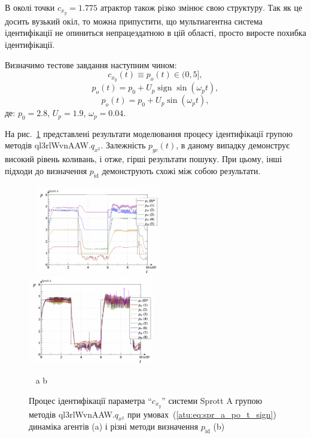 \documentclass[a4paper,13pt]{atuaref}
\DeclareMathOperator*{\sign}{sign}
\begin{document}
В околі точки $c_{x_y} = 1.775$ атрактор також різко змінює свою
структуру. Так як це досить вузький окіл, то можна припустити, що
мультиагентна система ідентифікації не опиниться непрацездатною в цій області,
просто виросте похибка ідентифікації.

Визначимо тестове завдання наступним чином:
\[
  c_{x_y}(t) \equiv p_o(t) \in (0, 5],
\]
%
\begin{equation}
  p_o(t) = p_0 +  U_{p} \sign \sin( \omega_{p} t ),
  \label{atu:eq:spr_a_po_t_sign}
\end{equation}
%
%
\begin{equation}
  p_o(t) = p_0 +  U_{p} \sin( \omega_{p} t ),
  \label{atu:eq:spr_a_po_t_sin}
\end{equation}
%
де:
$p_0 = 2.8$, $U_p=1.9$, $\omega_p=0.04$.

На рис.~\ref{atu:f:spr_a_id_ql3rlWvnAAW.q_x2_sign}
представлені результати моделювання процесу ідентифікації групою методів ql3rlWvnAAW.$q_{x^2}$.
Залежність $p_{gc} (t)$, в даному випадку демонструє високий
рівень коливань, і отже, гірші результати пошуку. При цьому, інші підходи до
визначення $p_\mathrm{id}$ демонструють схожі між собою результати.

\begin{figure}[ht!]
  \centerline{
    ~ \hfill
    \includegraphics[width=0.49\textwidth]{p5/p/cha/spr_a/ql3rlWvnAAW_x2/sprott_a_id-p_t_pi_ql3rlWvnAAW_sign_xl.png}
    \hfill
    \includegraphics[width=0.49\textwidth]{p5/p/cha/spr_a/ql3rlWvnAAW_x2/sprott_a_id-p_t_p_ql3rlWvnAAW_sign_xl.png}
    \hfill ~
  }
  \vspace{-1.5ex}
  \begin{center}
    ~ \hfill a \hfill\hfill b \hfill ~
  \end{center}
  \vspace{-2.5ex}
  \caption{Процес ідентифікації параметра ``$c_{x_y}$'' системи Sprott A групою методів ql3rlWvnAAW.$q_{x^2}$ при умовах~(\ref{atu:eq:spr_a_po_t_sign})
  динаміка агентів (a) і різні методи визначення $p_\mathrm{id}$ (b)}
  \label{atu:f:spr_a_id_ql3rlWvnAAW.q_x2_sign}
\end{figure}
\end{document}
